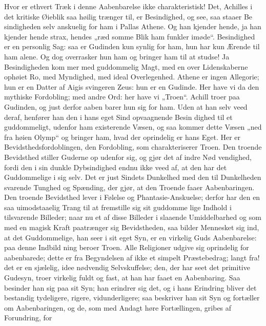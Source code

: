 \documentclass[12pt]{book}
\newcommand{\opage}[1]{\marginnote{\footnotesize\textit{[#1]}}}
\begin{document}
Hvor er ethvert Træk i denne Aabenbarelse ikke
charakteristisk! Det, Achilles i det kritiske Øieblik saa
høilig trænger til, er Besindighed, og see, saa staaer Be\-%
sindigheden selv anskuelig for ham i Pallas Athene. Og han
kjender hende, ja han kjender hende strax, hendes „ræd\-%
somme Blik ham funkler imøde“. Besindighed er en
personlig Sag: saa er Gudinden kun synlig for ham, hun
har kun Ærende til ham alene. Og dog overrasker hun
ham og bringer ham til at studse! Ja Besindigheden kom\-%
mer med guddommelig Magt, med en over Lidenskaberne
ophøiet Ro, med Myndighed, med ideal Overlegenhed.
Athene er ingen Allegorie; hun er en Datter af Aigis\-%
svingeren Zeus: hun er en Gudinde. Her have vi da
den mythiske Fordobling; med andre Ord: her have vi
„Troen“. Achill troer paa Gudinden, og just derfor aaben\-%
barer hun sig for ham. Uden at han selv veed deraf,
henfører han den i hans eget Sind opvaagnende Besin\-%
dighed til et guddommeligt, udenfor ham existerende
Væsen, og saa kommer dette Væsen „ned fra høien
Olymp“ og bringer ham, hvad der oprindelig er hans
Eget. Her er Bevidsthedsfordoblingen, den Fordobling,
som charakteriserer Troen. Den troende Bevidsthed
stiller Guderne op udenfor sig, og gjør det af indre Nød\-%
vendighed, fordi den i sin dunkle Dybsindighed endnu
\opage{94}\setcounter{footnote}{0}%
ikke veed af, at den har det Guddommelige i sig selv.
Det er just Sindets Dunkelhed med den til Dunkelheden
svarende Tunghed og Spænding, der gjør, at den Troende
faaer Aabenbaringen. Den troende Bevidsthed lever i
Følelse og Phantasie-Anskuelse; derfor har den en saa
uimodstaaelig Trang til at fremstille sig sit guddomme\-%
lige Indhold i tilsvarende Billeder; naar nu et af disse
Billeder i slaaende Umiddelbarhed og som med en magisk
Kraft paatrænger sig Bevidstheden, saa bilder Mennesket
sig ind, at det Guddommelige, han seer i sit eget Syn,
er en virkelig Guds Aabenbarelse: paa denne Indbild\-%
ning beroer Troen. Alle Religioner udgive sig oprindelig
for aabenbarede; dette er fra Begyndelsen af ikke et
simpelt Præstebedrag; langt fra! det er en sjælelig, idee\-%
nødvendig Selvskuffelse; den, der har seet det primitive
Gudesyn, troer virkelig fuldt og fast, at han har faaet
en Aabenbaring. Saa besinder han sig paa sit Syn; han
erindrer sig det, og i hans Erindring bliver det bestandig
tydeligere, rigere, vidunderligere; saa beskriver han sit
Syn og fortæller om Aabenbaringen, og de, som med
Andagt høre Fortællingen, gribes af Forundring, for\-%
\end{document}
